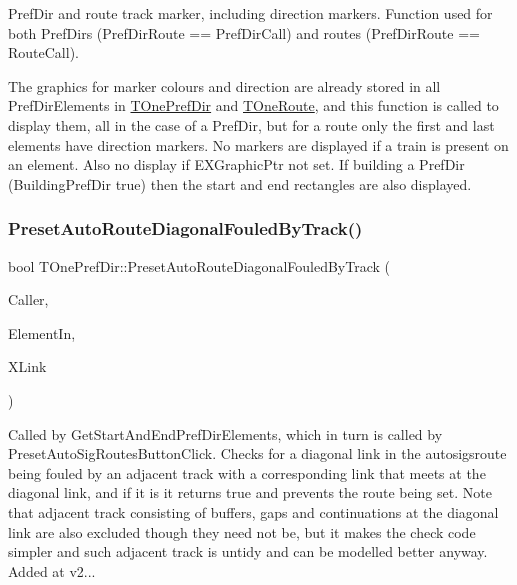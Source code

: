 Pref\+Dir and route track marker, including direction markers. Function used for both Pref\+Dirs (Pref\+Dir\+Route == Pref\+Dir\+Call) and routes (Pref\+Dir\+Route == Route\+Call).

The graphics for marker colours and direction are already stored in all Pref\+Dir\+Elements in \mbox{\hyperlink{class_t_one_pref_dir}{T\+One\+Pref\+Dir}} and \mbox{\hyperlink{class_t_one_route}{T\+One\+Route}}, and this function is called to display them, all in the case of a Pref\+Dir, but for a route only the first and last elements have direction markers. No markers are displayed if a train is present on an element. Also no display if E\+X\+Graphic\+Ptr not set. If building a Pref\+Dir (Building\+Pref\+Dir true) then the start and end rectangles are also displayed. \mbox{\label{class_t_one_pref_dir_ae0e03d494164fe961da51b0be8492934}} 
\subsubsection{\texorpdfstring{Preset\+Auto\+Route\+Diagonal\+Fouled\+By\+Track()}{PresetAutoRouteDiagonalFouledByTrack()}}
{\footnotesize\ttfamily bool T\+One\+Pref\+Dir\+::\+Preset\+Auto\+Route\+Diagonal\+Fouled\+By\+Track (\begin{DoxyParamCaption}\item[{int}]{Caller,  }\item[{\mbox{\hyperlink{class_t_pref_dir_element}{T\+Pref\+Dir\+Element}}}]{Element\+In,  }\item[{int}]{X\+Link }\end{DoxyParamCaption})\hspace{0.3cm}{\ttfamily [protected]}}

Called by Get\+Start\+And\+End\+Pref\+Dir\+Elements, which in turn is called by Preset\+Auto\+Sig\+Routes\+Button\+Click. Checks for a diagonal link in the autosigsroute being fouled by an adjacent track with a corresponding link that meets at the diagonal link, and if it is it returns true and prevents the route being set. Note that adjacent track consisting of buffers, gaps and continuations at the diagonal link are also excluded though they need not be, but it makes the check code simpler and such adjacent track is untidy and can be modelled better anyway. Added at v2... \mbox{\label{class_t_one_pref_dir_ab35c683ba0ec156d19d4db991046b7d2}} 
